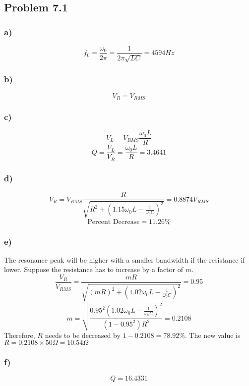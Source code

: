 \documentclass[../homework.tex]{subfiles}
\begin{document}
\subsection{Problem 7.1}
\subsubsection*{a)}
\begin{equation*}
    f_0 = \frac{\omega_0}{2 \pi} = \frac{1}{2 \pi \sqrt{LC}} = 4594Hz
\end{equation*}
\subsubsection*{b)}
\begin{equation*}
    V_{R} = V_{RMS}
\end{equation*}
\subsubsection*{c)}
\begin{equation*}
    V_L = V_{RMS} \frac{\omega_0 L}{ R}
\end{equation*}
\begin{equation*}
    Q = \frac{V_L}{V_R} = \frac{\omega_0 L}{R} = 3.4641
\end{equation*}
\subsubsection*{d)}
\begin{equation*}
    V_R = V_{RMS} \frac{R}{\sqrt{R^2 + (1.15 \omega_0 L - \frac{1}{\omega_0 C})^2}} = 0.8874 V_{RMS}
\end{equation*}
\begin{equation*}
    \text{Percent Decrease} = 11.26\%  
\end{equation*}
\subsubsection*{e)}
The resonance peak will be higher with a smaller bandwidth if the resistance if lower. Suppose the resistance has to increase by a factor of $m$.
\begin{equation*}
    \frac{V_R}{V_{RMS}} = \frac{mR}{\sqrt{(mR)^2 + (1.02 \omega_0 L - \frac{1}{\omega_0 C})^2}} = 0.95
\end{equation*}
\begin{equation*}
    m = \sqrt{\frac{0.95^2 (1.02\omega_0 L - \frac{1}{\omega_0 C})^2}{(1-0.95^2) R^2}} = 0.2108
\end{equation*}
Therefore, $R$ needs to be decreased by $1 - 0.2108 = 78.92\%$. The new value is $R = 0.2108 \times 50 \Omega = 10.54\Omega$

\subsubsection*{f)}
\begin{equation*}
    Q = 16.4331
\end{equation*}
\end{document}
